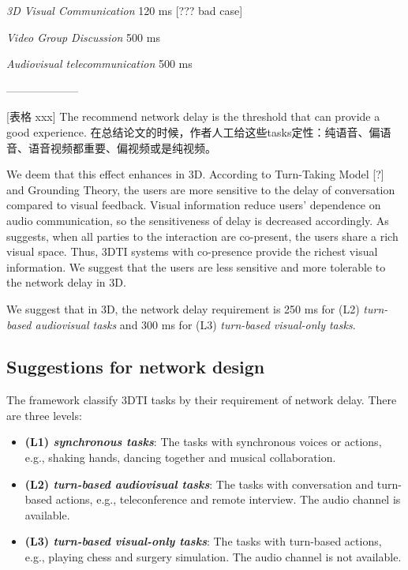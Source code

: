 \emph{3D Visual Communication} \cite{wu2009quality} 120 ms [??? bad case]

\emph{Video Group Discussion} \cite{schmitt2014asymmetric}  500 ms

\emph{Audiovisual telecommunication} \cite{tam2012video} 500 ms

--------------------

[表格 xxx] The recommend network delay is the threshold that can provide a good experience. 在总结论文的时候，作者人工给这些tasks定性：纯语音、偏语音、语音视频都重要、偏视频或是纯视频。

We deem that this effect enhances in 3D. According to Turn-Taking Model [?] and Grounding Theory, the users are more sensitive to the delay of conversation compared to visual feedback. Visual information reduce users' dependence on audio communication, so the sensitiveness of delay is decreased accordingly. As \cite{kraut2002use, kraut2003visual} suggests, when all parties to the interaction are co-present, the users share a rich visual space. Thus, 3DTI systems with co-presence provide the richest visual information. We suggest that the users are less sensitive and more tolerable to the network delay in 3D.

We suggest that in 3D, the network delay requirement is 250 ms for (L2) \emph{turn-based audiovisual tasks} and 300 ms for (L3) \emph{turn-based visual-only tasks}.

\subsection{Suggestions for network design}

The framework classify 3DTI tasks by their requirement of network delay. There are three levels:

\begin{itemize}
    \item \textbf{(L1) \emph{synchronous tasks}}: The tasks with synchronous voices or actions, e.g., shaking hands, dancing together and musical collaboration.
    \item \textbf{(L2) \emph{turn-based audiovisual tasks}}: The tasks with conversation and turn-based actions, e.g., teleconference and remote interview. The audio channel is available.
    \item \textbf{(L3) \emph{turn-based visual-only tasks}}: The tasks with turn-based actions, e.g., playing chess and surgery simulation. The audio channel is not available.
\end{itemize}

